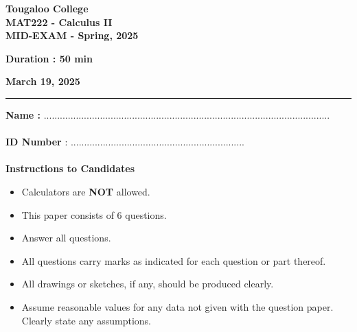 \documentclass[12pt]{exam}
\newcommand{\paper}[5]{
    \setcounter{page}{1}
    
    \begin{minipage}{\textwidth}
    \Large{\textbf{Tougaloo College}}\\
    \textbf{#2}\\
    \textbf{#5 - #3}\\
    \end{minipage}
    \hfill
        \begin{minipage}{6in}
            \textbf{\hspace{0.25in}Duration : #1 }
        \end{minipage}
        \hfill
        \begin{minipage}{3in}
            \textbf{March 19, 2025}
        \end{minipage}
    
    \vspace{0.1in}
    \rule[1ex]{\textwidth}{2pt}
    }
\begin{document}
\paper{50 min}{MAT222 - Calculus II}{Spring, 2025}{}{MID-EXAM}

\noindent \textbf{Name :}  ...........................................................................................................\\
\vspace{0.1in}\\
\textbf{ID Number} : .................................................................\\
\vspace{0.2in}\\
\hspace*{0.2in}\textbf{Instructions to Candidates }
\begin{itemize}
    \item Calculators are \textbf{NOT} allowed. 
    \item This paper consists of $6$ questions.
    \item Answer all questions. 
    \item All questions carry marks as indicated for each question or part thereof.
    \item All drawings or sketches, if any, should be produced clearly.
    \item Assume reasonable values for any data not given with the question paper. Clearly state any assumptions.
\end{itemize}
\end{document}
